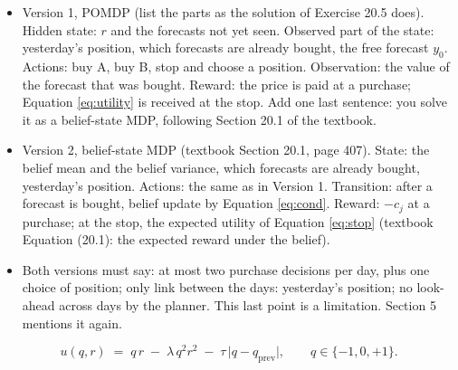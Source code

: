 \documentclass{article}
\newenvironment{pts}{\begin{itemize}[nosep,leftmargin=1.15em,topsep=1pt]}{\end{itemize}}
\newcommand{\qprev}{q_{\mathrm{prev}}}
\begin{document}
\begin{note}
\begin{pts}
\item Version 1, POMDP (list the parts as the solution of Exercise 20.5 does). Hidden state: $r$ and the forecasts not yet seen. Observed part of the state: yesterday's position, which forecasts are already bought, the free forecast $y_0$. Actions: buy A, buy B, stop and choose a position. Observation: the value of the forecast that was bought. Reward: the price is paid at a purchase; Equation \eqref{eq:utility} is received at the stop. Add one last sentence: you solve it as a belief-state MDP, following Section 20.1 of the textbook.
\item Version 2, belief-state MDP (textbook Section 20.1, page 407). State: the belief mean and the belief variance, which forecasts are already bought, yesterday's position. Actions: the same as in Version 1. Transition: after a forecast is bought, belief update by Equation \eqref{eq:cond}. Reward: $-c_j$ at a purchase; at the stop, the expected utility of Equation \eqref{eq:stop} (textbook Equation (20.1): the expected reward under the belief).
\item Both versions must say: at most two purchase decisions per day, plus one choice of position; only link between the days: yesterday's position; no look-ahead across days by the planner. This last point is a limitation. Section 5 mentions it again.
\end{pts}
\end{note}

\begin{equation}
u(q, r) \;=\; q\,r \;-\; \lambda\,q^{2} r^{2} \;-\; \tau\,\lvert q - \qprev \rvert ,
\qquad q \in \{-1, 0, +1\}.
\label{eq:utility}
\end{equation}
\end{document}

